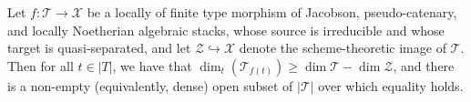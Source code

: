 %
\begin{lemma}
\label{lemma-dims-of-images}
Let $f: \mathcal{T} \to \mathcal{X}$ be a locally of finite type
morphism of Jacobson, pseudo-catenary, and locally Noetherian
algebraic stacks,
whose source is irreducible and whose target is quasi-separated,
and let $\mathcal{Z} \hookrightarrow \mathcal{X}$ denote the scheme-theoretic
image of $\mathcal{T}$.
Then for all $t \in |T|$,
we have that
$\dim_t( \mathcal{T}_{f(t)}) \geq \dim \mathcal{T}  - \dim \mathcal{Z}$,
and there is a non-empty (equivalently, dense)
open subset of $|\mathcal{T}|$ over which equality holds.
\end{lemma}

